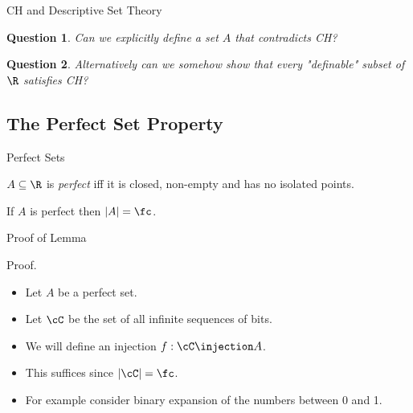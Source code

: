 \documentclass{beamer}
\newtheorem*{question}{Question}
\begin{document}
\begin{frame}{CH and Descriptive Set Theory}

\begin{question}
Can we explicitly define a set $A$ that contradicts CH?
\end{question}

\begin{question}
Alternatively can we somehow show that every "definable" subset of
$\R$ satisfies CH?
\end{question}

\end{frame}

\subsection{The Perfect Set Property}

\begin{frame}{Perfect Sets}

\begin{definition}
$A\subseteq\R$ is \emph{perfect} iff it is closed, non-empty
and has no isolated points.
\end{definition}

\begin{lemma}
If $A$ is perfect then $|A| = \fc$.
\end{lemma}

\end{frame}

\begin{frame}{Proof of Lemma}

\begin{block}{Proof.}
\begin{itemize}
  \item  Let $A$ be a perfect set.

  \item  Let $\cC$ be the set of all infinite sequences of bits.

  \item  We will define an injection $f : \cC \injection A$.

  \item  This suffices since $|\cC| = \fc$.

  \item  For example consider binary expansion of the numbers between 0 and 1.

\end{itemize}
\end{block}
\end{frame}
\end{document}
